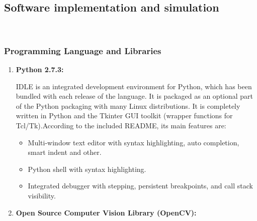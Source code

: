 \documentclass[12pt, a4paper]{article}
\begin{document}
\subsection{Software implementation and simulation}
~\\
\subsubsection{Programming Language and Libraries}
\begin{enumerate}

\item \textbf{Python 2.7.3:}

IDLE is an integrated development environment for Python, which has been bundled with each release of the language. It is packaged as an optional part of the Python packaging
with many Linux distributions. It is completely written in Python and the Tkinter GUI
toolkit (wrapper functions for Tcl/Tk).According to the included README, its main
features are:
\begin{itemize}
\item Multi-window text editor with syntax highlighting, auto completion, smart indent
and other.
\item Python shell with syntax highlighting.
\item Integrated debugger with stepping, persistent breakpoints, and call stack visibility.
\end{itemize}
\item \textbf{Open Source Computer Vision Library (OpenCV):}


\end{enumerate}
\end{document}
